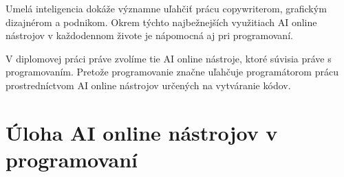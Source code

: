 Umelá inteligencia dokáže významne uľahčiť prácu copywriterom, grafickým dizajnérom a podnikom.  Okrem týchto najbežnejších využitiach AI online nástrojov v každodennom živote je nápomocná aj pri programovaní. \cite{brabencova_programatori_2023}
\par V diplomovej práci práve zvolíme tie AI online nástroje, ktoré súvisia práve s programovaním. Pretože programovanie značne uľahčuje programátorom prácu prostredníctvom AI online nástrojov určených na vytváranie kódov.





\section{Úloha AI online nástrojov v programovaní}

